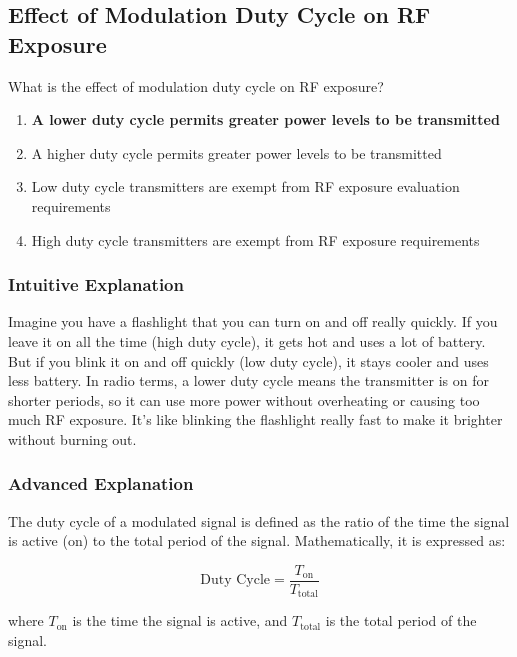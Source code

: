 \subsection{Effect of Modulation Duty Cycle on RF Exposure}
\label{G0A07}

\begin{tcolorbox}[colback=gray!10!white,colframe=black!75!black,title=G0A07]
What is the effect of modulation duty cycle on RF exposure?
\begin{enumerate}[label=\Alph*),noitemsep]
    \item \textbf{A lower duty cycle permits greater power levels to be transmitted}
    \item A higher duty cycle permits greater power levels to be transmitted
    \item Low duty cycle transmitters are exempt from RF exposure evaluation requirements
    \item High duty cycle transmitters are exempt from RF exposure requirements
\end{enumerate}
\end{tcolorbox}

\subsubsection{Intuitive Explanation}
Imagine you have a flashlight that you can turn on and off really quickly. If you leave it on all the time (high duty cycle), it gets hot and uses a lot of battery. But if you blink it on and off quickly (low duty cycle), it stays cooler and uses less battery. In radio terms, a lower duty cycle means the transmitter is on for shorter periods, so it can use more power without overheating or causing too much RF exposure. It's like blinking the flashlight really fast to make it brighter without burning out.

\subsubsection{Advanced Explanation}
The duty cycle of a modulated signal is defined as the ratio of the time the signal is active (on) to the total period of the signal. Mathematically, it is expressed as:

\[
\text{Duty Cycle} = \frac{T_{\text{on}}}{T_{\text{total}}}
\]

where \( T_{\text{on}} \) is the time the signal is active, and \( T_{\text{total}} \) is the total period of the signal.


